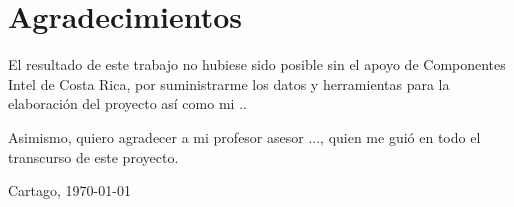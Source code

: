 \chapter*{Agradecimientos}
\thispagestyle{empty}

El resultado de este trabajo no hubiese sido posible sin el apoyo de Componentes Intel de Costa Rica, por suministrarme los datos y herramientas para la elaboración del proyecto así como mi ..\par
Asimismo, quiero agradecer a mi profesor asesor ..., quien me guió en todo el transcurso de este proyecto.\par

\vspace*{1cm}

\thesisAuthor

Cartago, \today

\cleardoublepage

